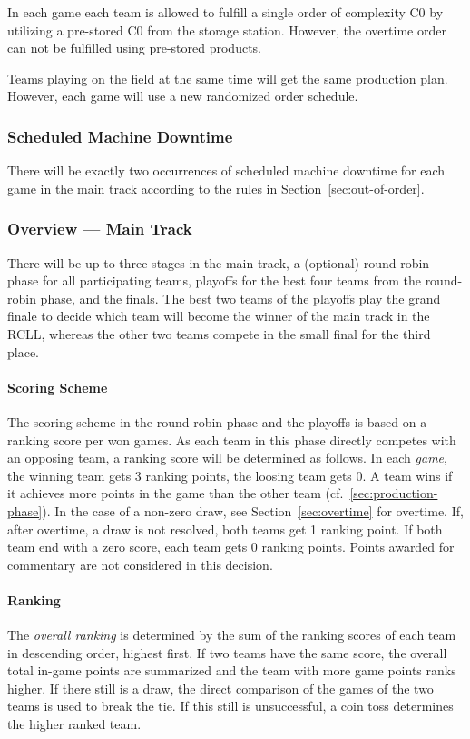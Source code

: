 \documentclass[12pt,twoside]{article}
\newcommand{\refsec}[1]{Section~\ref{#1}}
\begin{document}
In each game each team is allowed to fulfill a single order of complexity C0 by
utilizing a pre-stored C0 from the storage station.
However, the overtime order can not be fulfilled using pre-stored products.

Teams playing on the field at the same time will get the same
production plan. However, each game will use a new randomized order
schedule.

\subsubsection{Scheduled Machine Downtime}
There will be exactly two occurrences of scheduled machine downtime for each
game in the main track according to the rules in \refsec{sec:out-of-order}.

\subsubsection{Overview --- Main Track}
\label{sec:tournament-phases}
There will be up to three stages in the main track, a (optional) round-robin
phase for all participating teams, playoffs for the best four teams
from the round-robin phase, and the finals. The best two teams of the
playoffs play the grand finale to decide which team will become the
winner of the main track in the \ac{RCLL}, whereas the other two teams compete
in the small final for the third place.

\paragraph{Scoring Scheme}
The scoring scheme in the round-robin phase and the playoffs is based on a
ranking score per won games.
As each team in this phase directly competes with an opposing team, a ranking
score will be determined as follows.
In each \emph{game}, the winning team gets 3 ranking points, the
loosing team gets 0. A team wins if it achieves more points in the game than the
other team (cf.~\ref{sec:production-phase}).
In the case of a non-zero draw, see \refsec{sec:overtime} for overtime.
If, after overtime, a draw is not resolved, both teams get 1 ranking point.
If both team end with a zero score, each team gets 0 ranking points.
Points awarded for commentary are not considered in this decision.

\paragraph{Ranking}
The \emph{overall ranking} is determined by the sum of the ranking scores of
each team in descending order, highest first.
If two teams have the same score, the overall total in-game points are
summarized and the team with more game points ranks higher. If there still is a
draw, the direct comparison of the games of the two teams is used to break the
tie. If this still is unsuccessful, a coin toss determines the higher ranked
team.
\end{document}
